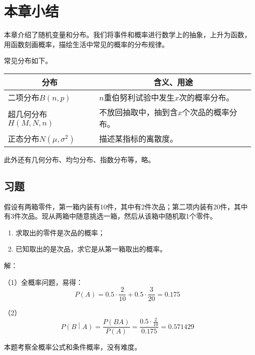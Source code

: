 \section{本章小结}

本章介绍了随机变量和分布。我们将事件和概率进行数学上的抽象，上升为函数，用函数刻画概率，描绘生活中常见的概率的分布规律。

常见分布如下。
\begin{table}[h]
\centering
\begin{tabular}{ll}
    \toprule
    \multicolumn{1}{c}{分布} & \multicolumn{1}{c}{含义、用途}  \\
    \midrule
    二项分布$B\left( n,p \right) $ & $n$重伯努利试验中发生$x$次的概率分布。\\
    超几何分布$H\left( M,N,n \right) $ & 不放回抽取中，抽到含$x$个次品的概率分布。\\
    正态分布$N\left( \mu ,\sigma ^2 \right) $ & 描述某指标的离散度。\\
    \bottomrule
\end{tabular}
\end{table}

此外还有几何分布、均匀分布、指数分布等，略。

\subsection{习题}

\begin{example}
假设有两箱零件，第一箱内装有10件，其中有2件次品；第二项内装有20件，其中有3件次品。现从两箱中随意挑选一箱，然后从该箱中随机取1个零件。
\begin{enumerate}
    \item 求取出的零件是次品的概率；
    \item 已知取出的是次品，求它是从第一箱取出的概率。
\end{enumerate}
\end{example}

解：

（1）全概率问题，易得：
\[
P\left( A \right) =0.5\cdot \frac{2}{10}+0.5\cdot \frac{3}{20}=0.175
\]

（2）
\[
P\left( B \middle| A \right) =\frac{P\left( BA \right)}{P\left( A \right)}=\frac{0.5\cdot \frac{2}{10}}{0.175}=0.571429
\]

\begin{tcolorbox}
本题考察全概率公式和条件概率，没有难度。
\end{tcolorbox}


